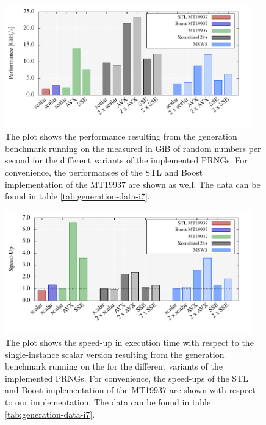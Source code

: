 \documentclass{stdlocal}
\begin{document}
    \begin{figure}
      \center
      \includegraphics[width=0.95\textwidth]{plots/generation_desktop.pdf}
      \caption[Generation Benchmark Performance for ]{%
        The plot shows the performance resulting from the generation benchmark running on the  measured in $\mathrm{GiB}$ of random numbers per second for the different variants of the implemented PRNGs.
        For convenience, the performances of the STL and Boost implementation of the MT19937 are shown as well.
        The data can be found in table \ref{tab:generation-data-i7}.
      }
    \end{figure}

    \begin{figure}
      \center
      \includegraphics[width=0.95\textwidth]{plots/generation_desktop_speedup.pdf}
      \caption[Generation Benchmark Speed-Up for ]{%
        The plot shows the speed-up in execution time with respect to the single-instance scalar version resulting from the generation benchmark running on the  for the different variants of the implemented PRNGs.
        For convenience, the speed-ups of the STL and Boost implementation of the MT19937 are shown with respect to our implementation.
        The data can be found in table \ref{tab:generation-data-i7}.
      }
    \end{figure}
\end{document}
